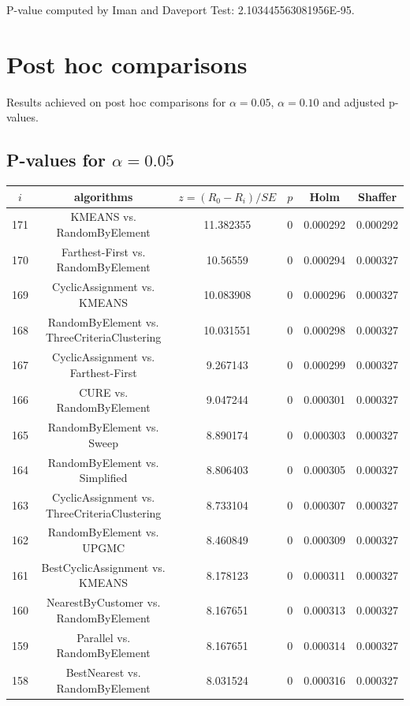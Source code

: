 \documentclass[a4paper,10pt]{article}
\begin{document}
\begin{landscape}
P-value computed by Iman and Daveport Test: 2.103445563081956E-95.\newline



\pagebreak

\section{Post hoc comparisons}

Results achieved on post hoc comparisons for $\alpha = 0.05$, $\alpha = 0.10$ and adjusted p-values.

\subsection{P-values for $\alpha=0.05$}

\begin{table}[!htp]
\centering\scriptsize
\begin{tabular}{cccccc}
$i$&algorithms&$z=(R_0 - R_i)/SE$&$p$&Holm&Shaffer\\
\hline171&KMEANS vs. RandomByElement&11.382355&0&0.000292&0.000292\\
170&Farthest-First vs. RandomByElement&10.56559&0&0.000294&0.000327\\
169&CyclicAssignment vs. KMEANS&10.083908&0&0.000296&0.000327\\
168&RandomByElement vs. ThreeCriteriaClustering&10.031551&0&0.000298&0.000327\\
167&CyclicAssignment vs. Farthest-First&9.267143&0&0.000299&0.000327\\
166&CURE vs. RandomByElement&9.047244&0&0.000301&0.000327\\
165&RandomByElement vs. Sweep&8.890174&0&0.000303&0.000327\\
164&RandomByElement vs. Simplified&8.806403&0&0.000305&0.000327\\
163&CyclicAssignment vs. ThreeCriteriaClustering&8.733104&0&0.000307&0.000327\\
162&RandomByElement vs. UPGMC&8.460849&0&0.000309&0.000327\\
161&BestCyclicAssignment vs. KMEANS&8.178123&0&0.000311&0.000327\\
160&NearestByCustomer vs. RandomByElement&8.167651&0&0.000313&0.000327\\
159&Parallel vs. RandomByElement&8.167651&0&0.000314&0.000327\\
158&BestNearest vs. RandomByElement&8.031524&0&0.000316&0.000327\\

\end{tabular}
\end{table}
\end{landscape}
\end{document}
